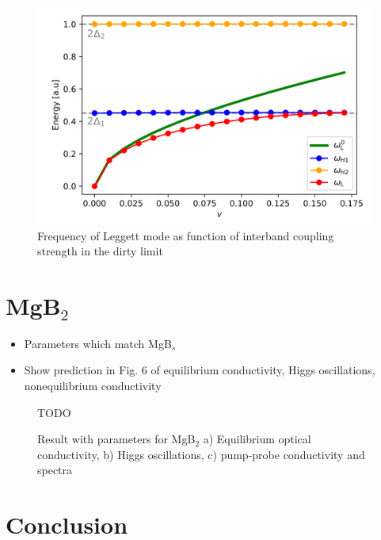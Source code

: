 \documentclass[aps,prb,reprint,noeprint,superscriptaddress]{revtex4-1}
\begin{document}
\begin{figure}[H]
    \centering
    \includegraphics[width=\columnwidth]{figures/leggett_coupling.png}
    \caption{\label{fig:leggett_coupling}%
    Frequency of Leggett mode as function of interband coupling strength in the dirty limit}
\end{figure}%



\section{MgB$_2$}
\label{sec:mgb2}

\begin{itemize}
	\item Parameters which match MgB$_s$
	\item Show prediction in Fig. 6 of equilibrium conductivity, Higgs oscillations, nonequilibrium conductivity
\end{itemize}

\begin{figure}[H]
    \centering
    \Huge{TODO}
    \caption{\label{fig:mgb2}%
    Result with parameters for MgB$_2$ a) Equilibrium optical conductivity, b) Higgs oscillations, c) pump-probe conductivity and spectra}
\end{figure}%



\section{Conclusion}
\label{sec:conclusion}
\end{document}
